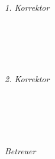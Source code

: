 \begin{titlepage}
	\centering

	\vfill
	{\large \thesisSubject} \\[5mm]
	{\LARGE \color{ctcolortitle}\textbf{\thesisTitle} \\[10mm]}
	{\Large \thesisName} \\

	\vfill
	\begin{minipage}[t]{.27\textwidth}
		\raggedleft\
		\textit{1. Korrektor}
	\end{minipage}
	\hspace*{15pt}
	\begin{minipage}[t]{.65\textwidth}
		{\Large \thesisFirstReviewer} \\
	  	{\small \thesisFirstReviewerDepartment} \\[-1mm]
		{\small \thesisFirstReviewerUniversity}
	\end{minipage} \\[5mm]
	\begin{minipage}[t]{.27\textwidth}
		\raggedleft\
		\textit{2. Korrektor}
	\end{minipage}
	\hspace*{15pt}
	\begin{minipage}[t]{.65\textwidth}
		{\Large \thesisSecondReviewer} \\
	  	{\small \thesisSecondReviewerDepartment} \\[-1mm]
		{\small \thesisSecondReviewerUniversity}
	\end{minipage} \\[10mm]
	\begin{minipage}[t]{.27\textwidth}
		\raggedleft\
		\textit{Betreuer}
	\end{minipage}
	\hspace*{15pt}
	\begin{minipage}[t]{.65\textwidth}
		\thesisSupervisor\
	\end{minipage} \\[10mm]

	\thesisDate\\ %

\end{titlepage}


